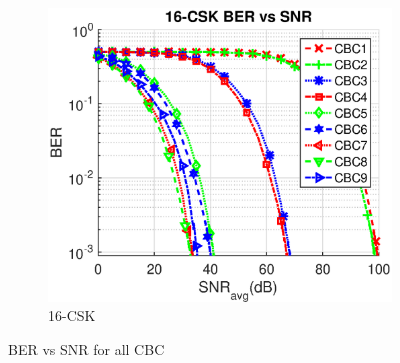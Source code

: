 \documentclass[10pt,letterpaper]{article}
\begin{document}
\begin{figure}[t]
		\begin{subfigure}{0.32\textwidth}
		\centering
			\includegraphics[trim={0.0in 0.0in 0.1in 0.3in}, clip=true, width=\textwidth]{M16_16-CSK_BERvsSNR_NL.eps}
			\caption{16-CSK}
			\label{fig16SNR_NL}
		\end{subfigure}
	\caption{BER vs SNR for all CBC}
	\label{figBERvsSNR_NL}
\end{figure}
\end{document}
